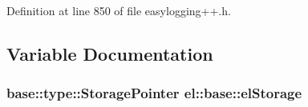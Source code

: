 Definition at line 850 of file easylogging++.\+h.



\subsection{Variable Documentation}
\hypertarget{namespaceel_1_1base_a0ec6b7a1bd89ad58dadc10f190142018}{}
\subsubsection[{el\+Storage}]{ {\bf base\+::type\+::\+Storage\+Pointer} el\+::base\+::el\+Storage}\label{namespaceel_1_1base_a0ec6b7a1bd89ad58dadc10f190142018}
